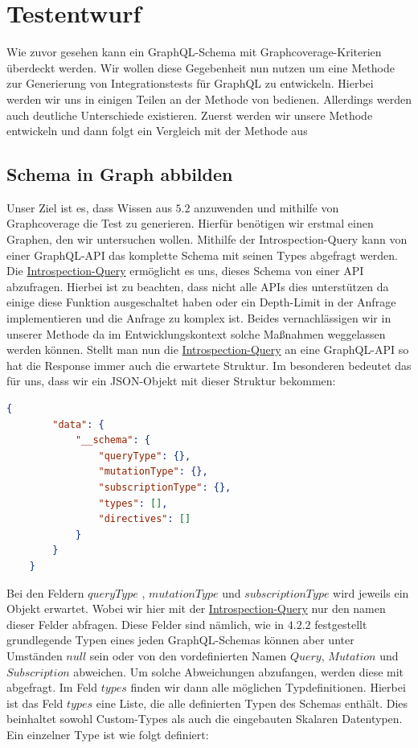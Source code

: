 \chapter{Testentwurf}

Wie zuvor gesehen kann ein GraphQL-Schema mit Graphcoverage-Kriterien überdeckt werden.
Wir wollen diese Gegebenheit nun nutzen um eine Methode zur Generierung von Integrationstests für GraphQL zu entwickeln.
Hierbei werden wir uns in einigen Teilen an der Methode von \cite[Property-based Testing of GraphQL-APIs]{property-based-testing} bedienen.
Allerdings werden auch deutliche Unterschiede existieren.
Zuerst werden wir unsere Methode entwickeln und dann folgt ein Vergleich mit der Methode aus \cite[Property-based Testing of GraphQL-APIs]{property-based-testing}

\section{Schema in Graph abbilden}

Unser Ziel ist es, dass Wissen aus $5.2$ anzuwenden und mithilfe von Graphcoverage die Test zu generieren.
Hierfür benötigen wir erstmal einen Graphen, den wir untersuchen wollen.
Mithilfe der Introspection-Query kann von einer GraphQL-API das komplette Schema mit seinen Types abgefragt werden.
Die \hyperref[introspection-query]{Introspection-Query} ermöglicht es uns, dieses Schema von einer API abzufragen.
Hierbei ist zu beachten, dass nicht alle APIs dies unterstützen da einige diese Funktion ausgeschaltet haben oder
ein Depth-Limit in der Anfrage implementieren und die Anfrage zu komplex ist.
Beides vernachlässigen wir in unserer Methode da im Entwicklungskontext solche Maßnahmen weggelassen werden können.
Stellt man nun die \hyperref[introspection-query]{Introspection-Query} an eine GraphQL-API so hat die Response immer auch
die erwartete Struktur.
Im besonderen bedeutet das für uns, dass wir ein JSON-Objekt mit dieser Struktur bekommen:

\begin{lstlisting}[language=json, caption={Schema-Response},captionpos=b]
    {
        "data": {
            "__schema": {
                "queryType": {},
                "mutationType": {},
                "subscriptionType": {},
                "types": [],
                "directives": []
            }
        }
    }
\end{lstlisting}

Bei den Feldern $queryType$ , $mutationType$ und $subscriptionType$ wird jeweils ein Objekt erwartet.
Wobei wir hier mit der \hyperref[introspection-query]{Introspection-Query} nur den namen dieser Felder abfragen.
Diese Felder sind nämlich, wie in $4.2.2$ festgestellt grundlegende Typen eines jeden GraphQL-Schemas
können aber unter Umständen $null$ sein oder von den vordefinierten Namen $Query$, $Mutation$ und $Subscription$ abweichen.
Um solche Abweichungen abzufangen, werden diese mit abgefragt.
Im Feld $types$ finden wir dann alle möglichen Typdefinitionen.
Hierbei ist das Feld $types$ eine Liste, die alle definierten Typen des Schemas enthält.
Dies beinhaltet sowohl Custom-Types als auch die eingebauten Skalaren Datentypen.
Ein einzelner Type ist wie folgt definiert:

